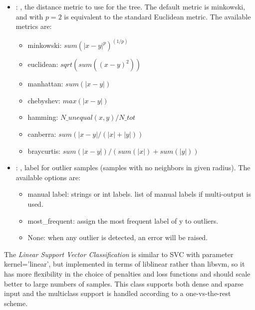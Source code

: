 \begin{itemize}
    \item {}: , 
      the distance metric to use for the tree. The default metric is minkowski, and with
      $p=2$ is equivalent to the standard Euclidean metric.
      The available metrics are:                                                  \begin{itemize}
      \item minkowski: $sum(|x - y|^p)^(1/p)$
      \item euclidean: $sqrt(sum((x - y)^2))$
      \item manhattan: $sum(|x - y|)$                                                    \item
      chebyshev: $max(|x - y|)$                                                    \item hamming:
      $N\_unequal(x, y) / N\_tot$                                                    \item canberra:
      $sum(|x - y| / (|x| + |y|))$                                                    \item
      braycurtis: $sum(|x - y|) / (sum(|x|) + sum(|y|))$
      \end{itemize}

    \item {}: , 
      label for outlier samples (samples with no neighbors in given radius).
      The available options are:                                                  \begin{itemize}
      \item manual label: strings or int labels. list of manual labels if multi-output is used.
      \item most\_frequent: assign the most frequent label of y to outliers.
      \item None: when any outlier is detected, an error will be raised.
      \end{itemize}
  \end{itemize}
 The  \textit{Linear Support Vector Classification} is
 similar to SVC with parameter kernel=’linear’, but implemented in terms of liblinear rather than
 libsvm,                             so it has more flexibility in the choice of penalties and loss
 functions and should scale better to large numbers of samples.                             This
 class supports both dense and sparse input and the multiclass support is handled according to a
 one-vs-the-rest scheme.                             

